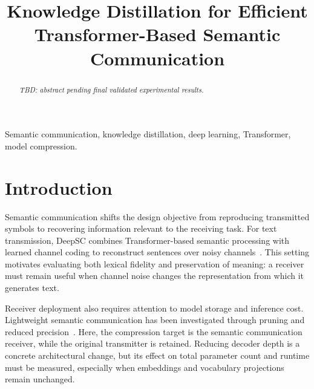 \documentclass[conference]{IEEEtran}
\begin{document}
\title{Knowledge Distillation for Efficient Transformer-Based Semantic Communication}



\author{
}
\maketitle

\begin{abstract}

\textit{TBD: abstract pending final validated experimental results.}

\end{abstract}

\begin{IEEEkeywords}
Semantic communication, knowledge distillation, deep learning, Transformer, model compression.
\end{IEEEkeywords}

\section{Introduction}
Semantic communication shifts the design objective from reproducing transmitted symbols to recovering information relevant to the receiving task. For text transmission, DeepSC combines Transformer-based semantic processing with learned channel coding to reconstruct sentences over noisy channels~\cite{xie2021deepsc}. This setting motivates evaluating both lexical fidelity and preservation of meaning: a receiver must remain useful when channel noise changes the representation from which it generates text.

Receiver deployment also requires attention to model storage and inference cost. Lightweight semantic communication has been investigated through pruning and reduced precision~\cite{xie2021lite}. Here, the compression target is the semantic communication receiver, while the original transmitter is retained. Reducing decoder depth is a concrete architectural change, but its effect on total parameter count and runtime must be measured, especially when embeddings and vocabulary projections remain unchanged.
\end{document}
